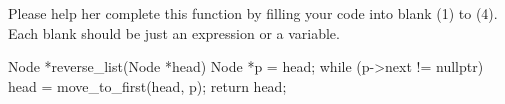 \begin{parts}
    Please help her complete this function by filling your code into blank (1) to (4). Each blank should be just an expression or a variable.

    \begin{solution}
        \begin{cpp}
            Node *reverse_list(Node *head) {
                Node *p = head;
                while (p->next != nullptr) {
                        head = move_to_first(head, p);
                }
                return head;
            }
        \end{cpp}
    \end{solution}



\end{parts}
